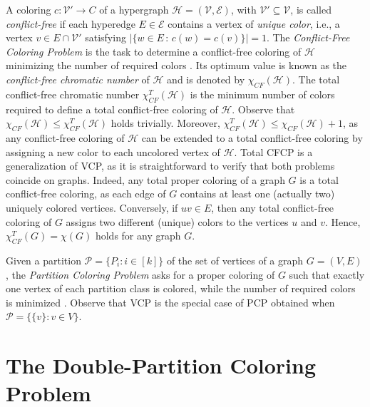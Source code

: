 \documentclass[preprint, 11pt, authoryear]{elsarticle}
\newcommand{\hip}{{\mathcal H}}
\newcommand{\VV}{{\mathcal V}}
\newcommand{\EE}{{\mathcal E}}
\newcommand{\PP}{{\mathcal P}}
\newcommand{\card}[1]{\left| #1 \right|}
\newcommand{\cn}[1]{\chi(#1)}
\newcommand{\cfcn}[1]{\chi_{CF}(#1)}
\newcommand{\cfcnT}[1]{\chi_{CF}^{T}(#1)}
\begin{document}
A coloring $c: \VV' \to C$ of a hypergraph $\hip=(\VV, \EE)$, with $\VV' \subseteq \VV$, is called \textit{conflict-free} if each hyperedge $E \in \EE$ contains a vertex of \emph{unique color}, i.e., a vertex $v \in E \cap \VV'$ satisfying $\card{\{ w \in E \, : \, c(w) = c(v) \}} = 1$. The \textit{Conflict-Free Coloring Problem}  is the task to determine a conflict-free coloring of $\hip$ minimizing the number of required colors \citep{Even2003}.
Its optimum value is known as the \textit{conflict-free chromatic number} of $\hip$ and is denoted by $\cfcn{\hip}$. 
The total conflict-free chromatic number $\cfcnT{\hip}$ is the minimum number of colors required to define a total conflict-free coloring of $\hip$. Observe that $\cfcn{\hip} \leq \cfcnT{\hip}$ holds trivially. Moreover, $\cfcnT{\hip} \leq \cfcn{\hip}+1$, as any %
conflict-free coloring of $\hip$ can be extended to a total conflict-free coloring by assigning a new color to each uncolored vertex of $\hip$.
Total CFCP is a generalization of VCP, as it is straightforward to verify that 
both problems coincide on graphs. Indeed,
any total proper coloring of a graph $G$ is a total conflict-free coloring, as each edge of $G$ contains at least one (actually two) uniquely colored vertices. Conversely, if $uv \in E$, then any total conflict-free coloring of $G$ assigns two different (unique) colors to the vertices $u$ and $v$. Hence, $\cfcnT{G} = \cn{G}$ holds for any graph $G$. 


Given a partition $\PP = \{P_i: i \in  [k]\}$ of the set of vertices of a graph $G=(V, E)$, the \emph{Partition Coloring Problem} asks for a proper 
coloring of $G$ such that exactly one vertex of each partition class is colored, while the number of required colors is minimized \citep{li2000partition}. %
Observe that VCP is the special case of PCP obtained when $\PP = \{\{v\} : v \in V\}$. %


\section{The Double-Partition Coloring Problem}
\label{sec:definition:dpcp}
\end{document}
